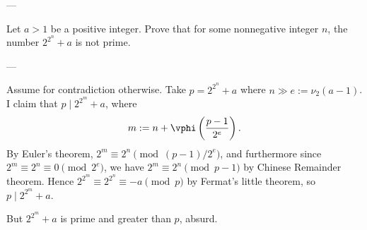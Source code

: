 
---

Let $a>1$ be a positive integer. Prove that for some nonnegative integer $n$, the number $2^{2^n}+a$ is not prime.

---

Assume for contradiction otherwise. Take $p=2^{2^n}+a$ where $n\gg e:=\nu_2(a-1)$. I claim that $p\mid2^{2^m}+a$, where \[m:=n+\vphi\left(\frac{p-1}{2^e}\right).\]
By Euler's theorem, $2^m\equiv2^n\pmod{(p-1)/2^e}$, and furthermore since $2^m\equiv2^n\equiv0\pmod{2^e}$, we have $2^m\equiv2^n\pmod{p-1}$ by Chinese Remainder theorem. Hence $2^{2^m}\equiv2^{2^n}\equiv-a\pmod p$ by Fermat's little theorem, so $p\mid2^{2^m}+a$.

But $2^{2^m}+a$ is prime and greater than $p$, absurd.


